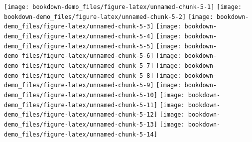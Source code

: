 \documentclass[
  12pt,
  brazil,
  a4paper,
  openany]{book}
\newenvironment{Shaded}{\begin{snugshade}}{\end{snugshade}}
\newcommand{\DataTypeTok}[1]{\textcolor[rgb]{0.13,0.29,0.53}{#1}}
\newcommand{\DecValTok}[1]{\textcolor[rgb]{0.00,0.00,0.81}{#1}}
\newcommand{\FloatTok}[1]{\textcolor[rgb]{0.00,0.00,0.81}{#1}}
\newcommand{\KeywordTok}[1]{\textcolor[rgb]{0.13,0.29,0.53}{\textbf{#1}}}
\newcommand{\NormalTok}[1]{#1}
\newcommand{\OperatorTok}[1]{\textcolor[rgb]{0.81,0.36,0.00}{\textbf{#1}}}
\newcommand{\OtherTok}[1]{\textcolor[rgb]{0.56,0.35,0.01}{#1}}
\newcommand{\StringTok}[1]{\textcolor[rgb]{0.31,0.60,0.02}{#1}}
\begin{document}
\texttt{[image: bookdown-demo\_files/figure-latex/unnamed-chunk-5-1]} \texttt{[image: bookdown-demo\_files/figure-latex/unnamed-chunk-5-2]} \texttt{[image: bookdown-demo\_files/figure-latex/unnamed-chunk-5-3]} \texttt{[image: bookdown-demo\_files/figure-latex/unnamed-chunk-5-4]} \texttt{[image: bookdown-demo\_files/figure-latex/unnamed-chunk-5-5]} \texttt{[image: bookdown-demo\_files/figure-latex/unnamed-chunk-5-6]} \texttt{[image: bookdown-demo\_files/figure-latex/unnamed-chunk-5-7]} \texttt{[image: bookdown-demo\_files/figure-latex/unnamed-chunk-5-8]} \texttt{[image: bookdown-demo\_files/figure-latex/unnamed-chunk-5-9]} \texttt{[image: bookdown-demo\_files/figure-latex/unnamed-chunk-5-10]} \texttt{[image: bookdown-demo\_files/figure-latex/unnamed-chunk-5-11]} \texttt{[image: bookdown-demo\_files/figure-latex/unnamed-chunk-5-12]} \texttt{[image: bookdown-demo\_files/figure-latex/unnamed-chunk-5-13]} \texttt{[image: bookdown-demo\_files/figure-latex/unnamed-chunk-5-14]}

\begin{Shaded}
\end{Shaded}
\end{document}
